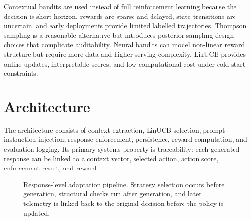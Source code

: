 \documentclass[conference]{IEEEtran}
\begin{document}
Contextual bandits are used instead of full reinforcement learning because the decision is short-horizon, rewards are sparse and delayed, state transitions are uncertain, and early deployments provide limited labelled trajectories. Thompson sampling is a reasonable alternative but introduces posterior-sampling design choices that complicate auditability. Neural bandits can model non-linear reward structure but require more data and higher serving complexity. LinUCB provides online updates, interpretable scores, and low computational cost under cold-start constraints.

\section{Architecture}

The architecture consists of context extraction, LinUCB selection, prompt instruction injection, response enforcement, persistence, reward computation, and evaluation logging. Its primary systems property is traceability: each generated response can be linked to a context vector, selected action, action score, enforcement result, and reward.

\begin{figure}[htbp]
\centering
{}
\caption{Response-level adaptation pipeline. Strategy selection occurs before generation, structural checks run after generation, and later telemetry is linked back to the original decision before the policy is updated.}
\label{fig:pipeline}
\end{figure}
\end{document}
